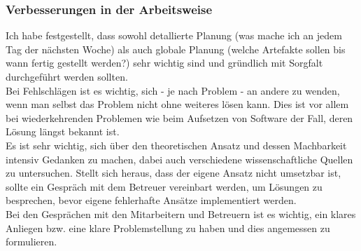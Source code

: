 \subsubsection{Verbesserungen in der Arbeitsweise}
Ich habe festgestellt, dass sowohl detallierte Planung (was mache ich an jedem Tag der nächsten Woche) als auch globale Planung (welche Artefakte sollen bis wann fertig gestellt werden?) sehr wichtig sind und gründlich mit Sorgfalt durchgeführt werden sollten. \\
Bei Fehlschlägen ist es wichtig, sich - je nach Problem - an andere zu wenden, wenn man selbst das Problem nicht ohne weiteres lösen kann. Dies ist vor allem bei wiederkehrenden Problemen wie beim Aufsetzen von Software der Fall, deren Lösung längst bekannt ist. \\
Es ist sehr wichtig, sich über den theoretischen Ansatz und dessen Machbarkeit intensiv Gedanken zu machen, dabei auch verschiedene wissenschaftliche Quellen zu untersuchen. Stellt sich heraus, dass der eigene Ansatz nicht umsetzbar ist, sollte ein Gespräch mit dem Betreuer vereinbart werden, um Lösungen zu besprechen, bevor eigene fehlerhafte Ansätze implementiert werden. \\
Bei den Gesprächen mit den Mitarbeitern und Betreuern ist es wichtig, ein klares Anliegen bzw. eine klare Problemstellung zu haben und dies angemessen zu formulieren.
